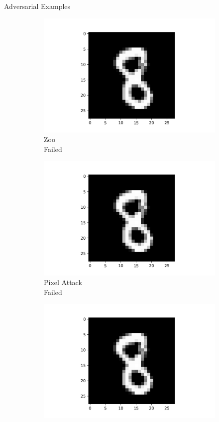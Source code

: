 \documentclass[9pt]{beamer}
\begin{document}
\begin{frame}{Adversarial Examples}
\begin{figure}
\begin{subfigure}[t]{0.24\linewidth}
        \includegraphics[width=\linewidth]{images/Zoo_8.png}
        \caption{Zoo\\Failed}
    \end{subfigure}
    \begin{subfigure}[t]{0.24\linewidth}
        \centering
        \captionsetup{justification=centering}
        \includegraphics[width=\linewidth]{images/PixelAttack_8.png}
        \caption{Pixel Attack\\Failed}
    \end{subfigure}
    \begin{subfigure}[t]{0.24\linewidth}
        \centering
        \captionsetup{justification=centering}
        \includegraphics[width=\linewidth]{images/clean_8.png}

\end{subfigure}
\end{figure}
\end{frame}
\end{document}
